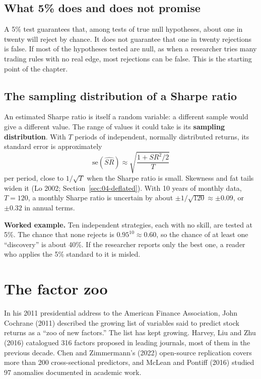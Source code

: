 \subsection{What 5\% does and does not promise}

A 5\% test guarantees that, among tests of true null hypotheses, about one in twenty will reject by chance. It does not guarantee that one in twenty rejections is false. If most of the hypotheses tested are null, as when a researcher tries many trading rules with no real edge, most rejections can be false. This is the starting point of the chapter.

\subsection{The sampling distribution of a Sharpe ratio}

An estimated Sharpe ratio is itself a random variable: a different sample would give a different value. The range of values it could take is its \textbf{sampling distribution}. With $T$ periods of independent, normally distributed returns, its standard error is approximately
\begin{equation}
  \mathrm{se}(\widehat{SR}) \approx \sqrt{\frac{1 + SR^2/2}{T}}
  \label{eq:04-sese}
\end{equation}
per period, close to $1/\sqrt{T}$ when the Sharpe ratio is small. Skewness and fat tails widen it (Lo 2002; Section~\ref{sec:04-deflated}). With 10 years of monthly data, $T = 120$, a monthly Sharpe ratio is uncertain by about $\pm 1/\sqrt{120} \approx \pm 0.09$, or $\pm 0.32$ in annual terms.

\textbf{Worked example.} Ten independent strategies, each with no skill, are tested at 5\%. The chance that none rejects is $0.95^{10} \approx 0.60$, so the chance of at least one ``discovery'' is about 40\%. If the researcher reports only the best one, a reader who applies the 5\% standard to it is misled.

\section{The factor zoo}
\label{sec:04-zoo}

In his 2011 presidential address to the American Finance Association, John Cochrane (2011) described the growing list of variables said to predict stock returns as a ``zoo of new factors.'' The list has kept growing. Harvey, Liu and Zhu (2016) catalogued 316 factors proposed in leading journals, most of them in the previous decade. Chen and Zimmermann's (2022) open-source replication covers more than 200 cross-sectional predictors, and McLean and Pontiff (2016) studied 97 anomalies documented in academic work.

